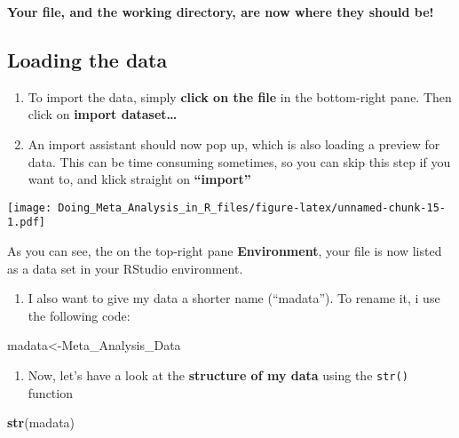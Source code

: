 \documentclass[]{book}
\newenvironment{Shaded}{\begin{snugshade}}{\end{snugshade}}
\newcommand{\KeywordTok}[1]{\textcolor[rgb]{0.13,0.29,0.53}{\textbf{#1}}}
\newcommand{\NormalTok}[1]{#1}
\providecommand{\tightlist}{%
  \setlength{\itemsep}{0pt}\setlength{\parskip}{0pt}}
\theoremstyle{definition}
\theoremstyle{definition}
\theoremstyle{definition}
\theoremstyle{remark}
\begin{document}
\textbf{Your file, and the working directory, are now where they should
be!}

\subsection{Loading the data}\label{loading-the-data}

\begin{enumerate}
\def\labelenumi{\arabic{enumi}.}
\tightlist
\item
  To import the data, simply \textbf{click on the file} in the
  bottom-right pane. Then click on \textbf{import dataset\ldots{}}
\item
  An import assistant should now pop up, which is also loading a preview
  for data. This can be time consuming sometimes, so you can skip this
  step if you want to, and klick straight on \textbf{``import''}
\end{enumerate}

\texttt{[image: Doing\_Meta\_Analysis\_in\_R\_files/figure-latex/unnamed-chunk-15-1.pdf]}

As you can see, the on the top-right pane \textbf{Environment}, your
file is now listed as a data set in your RStudio environment.

\begin{enumerate}
\def\labelenumi{\arabic{enumi}.}
\setcounter{enumi}{2}
\tightlist
\item
  I also want to give my data a shorter name (``madata''). To rename it,
  i use the following code:
\end{enumerate}

\begin{Shaded}
\begin{Highlighting}[]
\NormalTok{madata<-Meta_Analysis_Data}
\end{Highlighting}
\end{Shaded}

\begin{enumerate}
\def\labelenumi{\arabic{enumi}.}
\setcounter{enumi}{3}
\tightlist
\item
  Now, let's have a look at the \textbf{structure of my data} using the
  \texttt{str()} function
\end{enumerate}

\begin{Shaded}
\begin{Highlighting}[]
\KeywordTok{str}\NormalTok{(madata)}
\end{Highlighting}
\end{Shaded}
\end{document}
